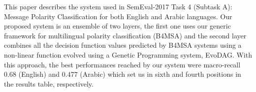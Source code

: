 This paper describes the system used in SemEval-2017 Task 4 (Subtask A): Message Polarity Classification for both English and Arabic languages. Our proposed system is an ensemble of two layers, the first one uses our generic framework for multilingual polarity classification (B4MSA) and the second layer combines all the decision function values predicted by B4MSA systems using a non-linear function evolved using a Genetic Programming system, EvoDAG. With this approach, the best performances reached by our system were macro-recall 0.68 (English) and 0.477 (Arabic) which set us in sixth and fourth positions in the results table, respectively.
